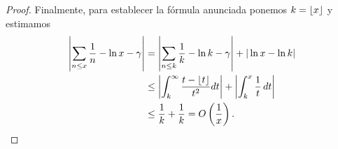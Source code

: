 \documentclass[10pt]{article}
\DeclarePairedDelimiter\floor{\lfloor}{\rfloor}
\theoremstyle{definition}
\theoremstyle{remark}
\begin{document}
\begin{proof}
Finalmente, para establecer la f\'ormula anunciada ponemos $k=\floor{x}$ y estimamos 
\begin{align}
\left|\sum_{n \le x} \frac{1}{n} - \ln x  - \gamma \right| &= \left|\sum_{n \le k} \frac{1}{k}  -\ln k -\gamma \right| + |\ln x -\ln k |  \\
& \le \left|   \int_k^\infty \frac{t - \floor{t}}{t^2} dt \right| + \left| \int_k^x  \frac{1}{t}\,dt  \right| \\
& \le \frac{1}{k} + \frac{1}{k} = O\left(\frac{1}{x}\right). 
\end{align}
\end{proof}
\end{document}
